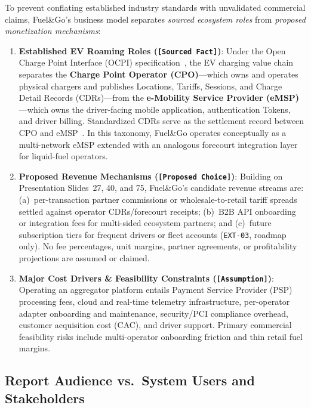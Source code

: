 To prevent conflating established industry standards with unvalidated commercial claims, Fuel\&Go's business model separates \emph{sourced ecosystem roles} from \emph{proposed monetization mechanisms}:

\begin{enumerate}[leftmargin=1.4em, itemsep=2pt]
  \item \textbf{Established EV Roaming Roles (\texttt{[Sourced Fact]})}: Under the Open Charge Point Interface (OCPI) specification~\cite{evroaming2025ocpi}, the EV charging value chain separates the \textbf{Charge Point Operator (CPO)}---which owns and operates physical chargers and publishes Locations, Tariffs, Sessions, and Charge Detail Records (CDRs)---from the \textbf{e-Mobility Service Provider (eMSP)}---which owns the driver-facing mobile application, authentication Tokens, and driver billing. Standardized CDRs serve as the settlement record between CPO and eMSP~\cite{evroaming2025ocpi}. In this taxonomy, Fuel\&Go operates conceptually as a multi-network eMSP extended with an analogous forecourt integration layer for liquid-fuel operators.
  \item \textbf{Proposed Revenue Mechanisms (\texttt{[Proposed Choice]})}: Building on Presentation Slides~27, 40, and 75, Fuel\&Go's candidate revenue streams are: (a)~per-transaction partner commissions or wholesale-to-retail tariff spreads settled against operator CDRs/forecourt receipts; (b)~B2B API onboarding or integration fees for multi-sided ecosystem partners; and (c)~future subscription tiers for frequent drivers or fleet accounts (\texttt{EXT-03}, roadmap only). No fee percentages, unit margins, partner agreements, or profitability projections are assumed or claimed.
  \item \textbf{Major Cost Drivers \& Feasibility Constraints (\texttt{[Assumption]})}: Operating an aggregator platform entails Payment Service Provider (PSP) processing fees, cloud and real-time telemetry infrastructure, per-operator adapter onboarding and maintenance, security/PCI compliance overhead, customer acquisition cost (CAC), and driver support. Primary commercial feasibility risks include multi-operator onboarding friction and thin retail fuel margins.
\end{enumerate}

\subsection{Report Audience vs.\ System Users and Stakeholders}
\label{sec:users-stakeholders}


